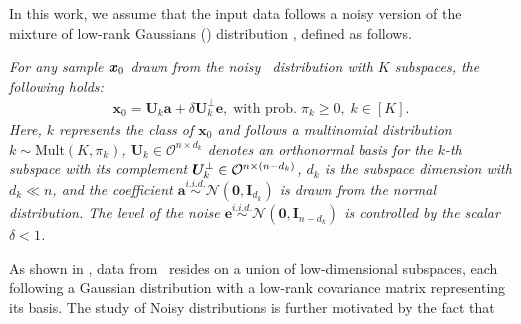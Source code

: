 
In this work, we assume that the input data follows a noisy version of the mixture of low-rank Gaussians (\MoLRG) distribution \citep{wang2024diffusion,elhamifar2013sparse, wang2022convergence}, defined as follows.


\begin{assum}\label{assum:subspace}
\emph{For any sample $\bm x_0$ drawn from the noisy \MoLRG~distribution with $K$ subspaces, the following holds: }
\begin{align}\label{eq:MoG noise}
    \bm x_0 = \bm U_k \bm a + \delta \bm U_k^{\perp} \bm e,\;\text{with prob.}\;\pi_k \geq 0,\; k \in [K].
\end{align}
\emph{Here, $k$ represents the class of $\bm x_0$ and follows a multinomial distribution $k \sim \text{Mult}(K,\pi_k)$, $\bm U_k \in \mathcal{O}^{n \times d_k}$ denotes an orthonormal basis for the $k$-th subspace with its complement $\bm U_k^\perp \in \mathcal{O}^{n \times (n-d_k)}$, $d_k$ is the subspace dimension with $d_k \ll n$, and the coefficient $\bm a \overset{i.i.d.}{\sim} \mathcal{N}(\bm 0, \bm I_{d_k})$ is drawn from the normal distribution. The level of the noise $\bm e \overset{i.i.d.}{\sim} \mathcal{N}(\bm 0, \bm I_{n-d_k})$ is controlled by the scalar $\delta < 1$. }
\end{assum}

As shown in , data from \MoLRG~resides on a union of low-dimensional subspaces, each following a Gaussian distribution with a low-rank covariance matrix representing its basis. The study of Noisy \MoLRG\; distributions is further motivated by the fact that

